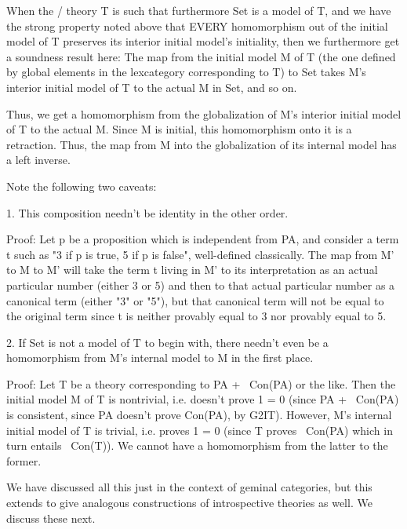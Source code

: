 \begin{TODOblock}
When the \initogeminal/ theory T is such that furthermore Set is a model of T, and we have the strong property noted above that EVERY homomorphism out of the initial model of T preserves its interior initial model's initiality, then we furthermore get a soundness result here: The map from the initial model M of T (the one defined by global elements in the lexcategory corresponding to T) to Set takes M's interior initial model of T to the actual M in Set, and so on.

Thus, we get a homomorphism from the globalization of M's interior initial model of T to the actual M. Since M is initial, this homomorphism onto it is a retraction. Thus, the map from M into the globalization of its internal model has a left inverse.

Note the following two caveats:

1. This composition needn't be identity in the other order.

Proof: Let p be a proposition which is independent from PA, and consider a term t such as "3 if p is true, 5 if p is false", well-defined classically. The map from M' to M to M' will take the term t living in M' to its interpretation as an actual particular number (either 3 or 5) and then to that actual particular number as a canonical term (either "3" or "5"), but that canonical term will not be equal to the original term since t is neither provably equal to 3 nor provably equal to 5.

2. If Set is not a model of T to begin with, there needn't even be a homomorphism from M's internal model to M in the first place.

Proof: Let T be a theory corresponding to PA + ~Con(PA) or the like. Then the initial model M of T is nontrivial, i.e. doesn't prove 1 = 0 (since PA + ~Con(PA) is consistent, since PA doesn't prove Con(PA), by G2IT). However, M's internal initial model of T is trivial, i.e. proves 1 = 0 (since T proves ~Con(PA) which in turn entails ~Con(T)). We cannot have a homomorphism from the latter to the former.
\end{TODOblock}

We have discussed all this just in the context of geminal categories, but this extends to give analogous constructions of introspective theories as well. We discuss these next.


